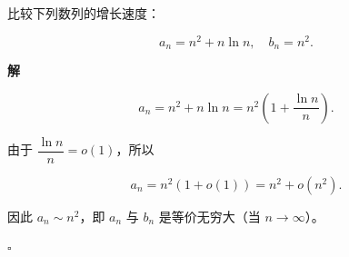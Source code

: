 \documentclass[fontset=fandol]{ctexart}
\newenvironment{solution}{\par\noindent\textbf{解}\quad}{\hfill$\square$\par\vspace{0.8em}}
\begin{document}
\begin{example}[利用 o 和 O 比较数列增长]

比较下列数列的增长速度：

\[

a_n = n^2 + n \ln n,\quad b_n = n^2.

\]



\begin{solution}

\[

a_n = n^2 + n \ln n = n^2 \left(1 + \dfrac{\ln n}{n}\right).

\]

由于 \(\dfrac{\ln n}{n} = o(1)\)，所以

\[

a_n = n^2 (1 + o(1)) = n^2 + o(n^2).

\]

因此 \(a_n \sim n^2\)，即 \(a_n\) 与 \(b_n\) 是等价无穷大（当 \(n \to \infty\)）。

\end{solution}

\end{example}
\end{document}
